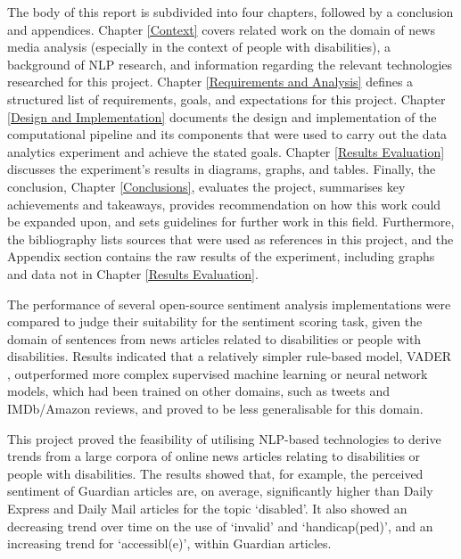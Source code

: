 \documentclass{report}
\begin{document}
The body of this report is subdivided into four chapters, followed by a conclusion and appendices.
Chapter \ref{Context} covers related work on the domain of news media analysis (especially in the context of people with disabilities), a background of NLP research, and information regarding the relevant technologies researched for this project.
Chapter \ref{Requirements and Analysis} defines a structured list of requirements, goals, and expectations for this project.
Chapter \ref{Design and Implementation} documents the design and implementation of the computational pipeline and its components that were used to carry out the data analytics experiment and achieve the stated goals.
Chapter \ref{Results Evaluation} discusses the experiment's results in diagrams, graphs, and tables.
Finally, the conclusion, Chapter \ref{Conclusions}, evaluates the project, summarises key achievements and takeaways, provides recommendation on how this work could be expanded upon, and sets guidelines for further work in this field.
Furthermore, the bibliography lists sources that were used as references in this project, and the Appendix section contains the raw results of the experiment, including graphs and data not in Chapter \ref{Results Evaluation}.

The performance of several open-source sentiment analysis implementations were compared to judge their suitability for the sentiment scoring task, given the domain of sentences from news articles related to disabilities or people with disabilities.
Results indicated that a relatively simpler rule-based model, VADER \cite{VADER}, outperformed more complex supervised machine learning or neural network models, which had been trained on other domains, such as tweets and IMDb/Amazon reviews, and proved to be less generalisable for this domain.

This project proved the feasibility of utilising NLP-based technologies to derive trends from a large corpora of online news articles relating to disabilities or people with disabilities.
The results showed that, for example, the perceived sentiment of Guardian articles are, on average, significantly higher than Daily Express and Daily Mail articles for the topic `disabled'.
It also showed an decreasing trend over time on the use of `invalid' and `handicap(ped)', and an increasing trend for `accessibl(e)', within Guardian articles.
\end{document}
